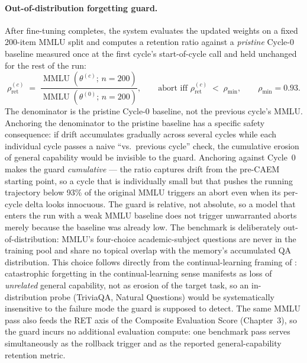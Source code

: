 \paragraph{Out-of-distribution forgetting guard.}
After fine-tuning completes, the system evaluates the updated weights on a fixed 200-item MMLU split and computes a retention ratio against a \emph{pristine} Cycle-0 baseline measured once at the first cycle's start-of-cycle call and held unchanged for the rest of the run:
\begin{equation}
\rho_{\text{ret}}^{(c)} \;=\; \frac{\operatorname{MMLU}(\theta^{(c)};\, n{=}200)}{\operatorname{MMLU}(\theta^{(0)};\, n{=}200)}, \qquad \text{abort iff } \rho_{\text{ret}}^{(c)} \;<\; \rho_{\min}, \qquad \rho_{\min} = 0.93.
\label{eq:forgetting-guard}
\end{equation}
The denominator is the pristine Cycle-0 baseline, not the previous cycle's MMLU. Anchoring the denominator to the pristine baseline has a specific safety consequence: if drift accumulates gradually across several cycles while each individual cycle passes a naive ``vs.~previous cycle'' check, the cumulative erosion of general capability would be invisible to the guard. Anchoring against Cycle~0 makes the guard \emph{cumulative} --- the ratio captures drift from the pre-CAEM starting point, so a cycle that is individually small but that pushes the running trajectory below 93\% of the original MMLU triggers an abort even when its per-cycle delta looks innocuous. The guard is relative, not absolute, so a model that enters the run with a weak MMLU baseline does not trigger unwarranted aborts merely because the baseline was already low. The benchmark is deliberately out-of-distribution: MMLU's four-choice academic-subject questions are never in the training pool and share no topical overlap with the memory's accumulated QA distribution. This choice follows directly from the continual-learning framing of \citet{doi:10.1073/pnas.1611835114}: catastrophic forgetting in the continual-learning sense manifests as loss of \emph{unrelated} general capability, not as erosion of the target task, so an in-distribution probe (TriviaQA, Natural Questions) would be systematically insensitive to the failure mode the guard is supposed to detect. The same MMLU pass also feeds the RET axis of the Composite Evaluation Score (Chapter~3), so the guard incurs no additional evaluation compute: one benchmark pass serves simultaneously as the rollback trigger and as the reported general-capability retention metric.

